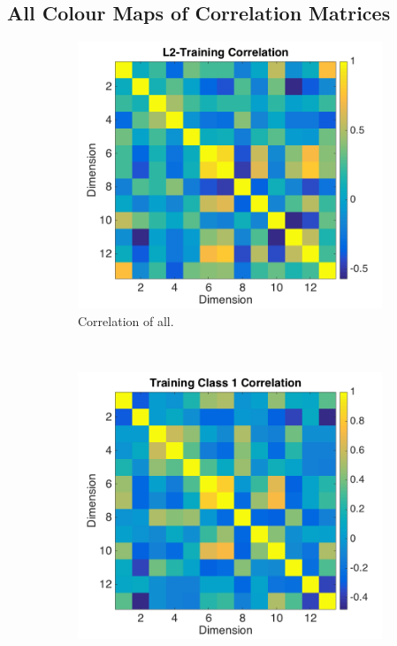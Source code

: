 \documentclass[a4paper, 10pt, conference]{ieeeconf}
\begin{document}
\subsection*{All Colour Maps of Correlation Matrices}
\begin{figure}[!ht]
  \captionsetup[subfigure]{position=b}
  \centering
    \begin{subfigure}{0.45\textwidth}
      \includegraphics[width=\textwidth]{pic/corrl2.png}
      \caption{Correlation of all.}
      \label{fig:corrtraining}
    \end{subfigure}
    ~
    \begin{subfigure}{0.45\textwidth}
      \includegraphics[width=\textwidth]{pic/corrclass1.png}

\end{subfigure}
\end{figure}
\end{document}
